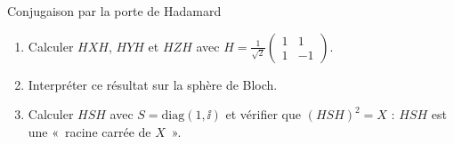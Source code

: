 \begin{exercice}{Conjugaison par la porte de Hadamard}\label{ex:conj}
\begin{enumerate}[label=\arabic*.,nosep]
  \item Calculer $HXH$, $HYH$ et $HZH$ avec $H=\frac{1}{\sqrt2}\begin{pmatrix}1&1\\1&-1\end{pmatrix}$.
  \item Interpréter ce résultat sur la sphère de Bloch.
  \item Calculer $HSH$ avec $S=\mathrm{diag}(1,\ii)$ et vérifier que $(HSH)^2=X$ : $HSH$ est une
        «~racine carrée de $X$~».
\end{enumerate}
\end{exercice}
\begin{correction}

\end{correction}
